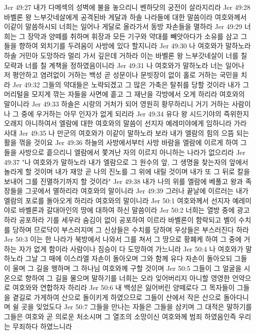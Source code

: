 Jer 49:27  내가 다메섹의 성벽에 불을 놓으리니 벤하닷의 궁전이 살라지리라
Jer 49:28  바벨론 왕 느부갓네살에게 공격된바 게달과 하솔 나라들에 대한 말씀이라 여호와께서 이같이 말씀하시되 너희는 일어나 게달로 올라가서 동방 자손들을 멸하라
Jer 49:29  너희는 그 장막과 양떼를 취하며 휘장과 모든 기구와 약대를 빼앗아다가 소유를 삼고 그들을 향하여 외치기를 두려움이 사방에 있다 할지니라
Jer 49:30  나 여호와가 말하노라 하솔 거민아 도망하라 멀리 가서 깊은데 거하라 이는 바벨론 왕 느부갓네살이 너를 칠 모략과 너를 칠 계책을 정하였음이니라
Jer 49:31  나 여호와가 말하노라 너는 일어나 저 평안하고 염려없이 거하는 백성 곧 성문이나 문빗장이 없이 홀로 거하는 국민을 치라
Jer 49:32  그들의 약대들은 노략되겠고 그 많은 가축은 탈취를 당할 것이라 내가 그 머리털을 모지게 깎는 자들을 사면에 흩고 그 재난을 각방에서 오게 하리라 여호와의 말이니라
Jer 49:33  하솔은 시랑의 거처가 되어 영원히 황무하리니 거기 거하는 사람이나 그 중에 우거하는 아무 인자가 없게 되리라
Jer 49:34  유다 왕 시드기야의 즉위한지 오래지 아니하여서 엘람에 대한 여호와의 말씀이 선지자 예레미야에게 임하니라 가라사대
Jer 49:35  나 만군의 여호와가 이같이 말하노라 보라 내가 엘람의 힘의 으뜸 되는 활을 꺾을 것이요
Jer 49:36  하늘의 사방에서부터 사방 바람을 엘람에 이르게 하여 그들을 사방으로 흩으리니 엘람에서 쫓겨난 자의 이르지 아니하는 나라가 없으리라
Jer 49:37  "나 여호와가 말하노라 내가 엘람으로 그 원수의 앞, 그 생명을 찾는자의 앞에서 놀라게 할 것이며 내가 재앙 곧 나의 진노를 그 위에 내릴 것이며 내가 또 그 뒤로 칼을 보내어 그를 진멸하기까지 할 것이라"
Jer 49:38  내가 나의 위를 엘람에 베풀고 왕과 족장들을 그곳에서 멸하리라 여호와의 말이니라
Jer 49:39  그러나 끝날에 이르러는 내가 엘람의 포로를 돌아오게 하리라 여호와의 말이니라
Jer 50:1  여호와께서 선지자 예레미야로 바벨론과 갈대아인의 땅에 대하여 하신 말씀이라
Jer 50:2  너희는 열방 중에 광고하라 공포하라 기를 세우라 숨김이 없이 공포하여 이르라 바벨론이 함락되고 벨이 수치를 당하며 므로닥이 부스러지며 그 신상들은 수치를 당하며 우상들은 부스러진다 하라
Jer 50:3  이는 한 나라가 북방에서 나와서 그를 쳐서 그 땅으로 황폐케 하여 그 중에 거하는 자가 없게 함이라 사람이나 짐승이 다 도망하여 가느니라
Jer 50:4  나 여호와가 말하노라 그날 그 때에 이스라엘 자손이 돌아오며 그와 함께 유다 자손이 돌아오되 그들이 울며 그 길을 행하며 그 하나님 여호와께 구할 것이며
Jer 50:5  그들이 그 얼굴을 시온으로 향하여 그 길을 물으며 말하기를 너희는 오라 잊어버리지 아니할 영영한 언약으로 여호와와 연합하자 하리라
Jer 50:6  내 백성은 잃어버린 양떼로다 그 목자들이 그들을 곁길로 가게하여 산으로 돌이키게 하였으므로 그들이 산에서 작은 산으로 돌아다니며 쉴 곳을 잊었도다
Jer 50:7  그들을 만나는 자들은 그들을 삼키며 그 대적은 말하기를 그들은 여호와 곧 의로운 처소시며 그 열조의 소망이신 여호와께 범죄 하였음인즉 우리는 무죄하다 하였느니라
